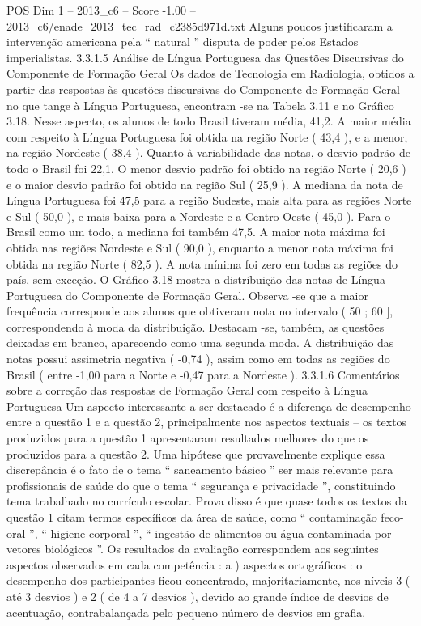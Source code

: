 \begin{textsample}{POS Dim 1 – 2013\_c6 – Score -1.00 – 2013\_c6/enade\_2013\_tec\_rad\_c2385d971d.txt}
Alguns poucos justificaram a intervenção americana pela “ natural ” disputa de poder pelos Estados imperialistas. 3.3.1.5 Análise de Língua Portuguesa das Questões Discursivas do Componente de Formação Geral Os dados de Tecnologia em Radiologia, obtidos a partir das respostas às questões discursivas do Componente de Formação Geral no que tange à Língua Portuguesa, encontram -se na Tabela 3.11 e no Gráfico 3.18.
Nesse aspecto, os alunos de todo Brasil tiveram média, 41,2.
A maior média com respeito à Língua Portuguesa foi obtida na região Norte ( 43,4 ), e a menor, na região Nordeste ( 38,4 ).
Quanto à variabilidade das notas, o desvio padrão de todo o Brasil foi 22,1.
O menor desvio padrão foi obtido na região Norte ( 20,6 ) e o maior desvio padrão foi obtido na região Sul ( 25,9 ).
A mediana da nota de Língua Portuguesa foi 47,5 para a região Sudeste, mais alta para as regiões Norte e Sul ( 50,0 ), e mais baixa para a Nordeste e a Centro-Oeste ( 45,0 ).
Para o Brasil como um todo, a mediana foi também 47,5.
A maior nota máxima foi obtida nas regiões Nordeste e Sul ( 90,0 ), enquanto a menor nota máxima foi obtida na região Norte ( 82,5 ).
A nota mínima foi zero em todas as regiões do país, sem exceção.
O Gráfico 3.18 mostra a distribuição das notas de Língua Portuguesa do Componente de Formação Geral.
Observa -se que a maior frequência corresponde aos alunos que obtiveram nota no intervalo ( 50 ; 60 ], correspondendo à moda da distribuição.
Destacam -se, também, as questões deixadas em branco, aparecendo como uma segunda moda.
A distribuição das notas possui assimetria negativa ( -0,74 ), assim como em todas as regiões do Brasil ( entre -1,00 para a Norte e -0,47 para a Nordeste ). 3.3.1.6 Comentários sobre a correção das respostas de Formação Geral com respeito à Língua Portuguesa Um aspecto interessante a ser destacado é a diferença de desempenho entre a questão 1 e a questão 2, principalmente nos aspectos textuais – os textos produzidos para a questão 1 apresentaram resultados melhores do que os produzidos para a questão 2.
Uma hipótese que provavelmente explique essa discrepância é o fato de o tema “ saneamento básico ” ser mais relevante para profissionais de saúde do que o tema “ segurança e privacidade ”, constituindo tema trabalhado no currículo escolar.
Prova disso é que quase todos os textos da questão 1 citam termos específicos da área de saúde, como “ contaminação feco-oral ”, “ higiene corporal ”, “ ingestão de alimentos ou água contaminada por vetores biológicos ”.
Os resultados da avaliação correspondem aos seguintes aspectos observados em cada competência : a ) aspectos ortográficos : o desempenho dos participantes ficou concentrado, majoritariamente, nos níveis 3 ( até 3 desvios ) e 2 ( de 4 a 7 desvios ), devido ao grande índice de desvios de acentuação, contrabalançada pelo pequeno número de desvios em grafia.

\end{textsample}
